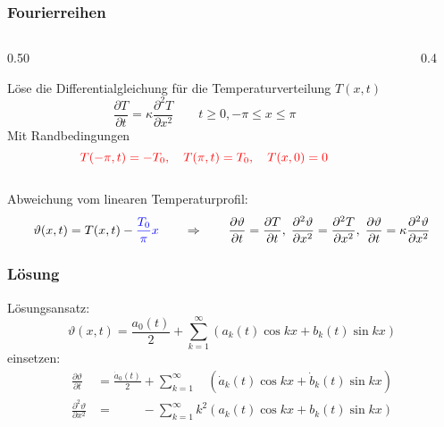 \begin{frame}
\frametitle{Fourierreihen}
\begin{columns}
\begin{column}{0.50\hsize}
\begin{aufgabe}
Löse die Differentialgleichung für die Temperaturverteilung $T(x,t)$
\vspace{-10pt}
\[
\frac{\partial T}{\partial t}
=
\kappa \frac{\partial^2 T}{\partial x^2}
\qquad
t\ge 0, -\pi \le x \le \pi
\]
Mit Randbedingungen
\[
\color{red}
T(-\pi,t) = -T_0,\quad T(\pi,t)=T_0,\quad T(x,0)=0
\]
\vspace{-10pt}
\end{aufgabe}
\end{column}
\begin{column}{0.4\hsize}
\begin{center}
\end{center}
\end{column}
\end{columns}
\begin{anomalie}
Abweichung vom linearen Temperaturprofil:
\[
\vartheta(x,t) = T(x,t) - {\color{blue}\frac{T_0}{\pi}x}
\qquad
\Rightarrow
\qquad
\frac{\partial \vartheta}{\partial t} = \frac{\partial T}{\partial t},
\;
\frac{\partial^2\vartheta}{\partial x^2} = \frac{\partial^2 T}{\partial x^2},
\;
\frac{\partial \vartheta}{\partial t}
=
\kappa \frac{\partial^2 \vartheta}{\partial x^2}
\]
\end{anomalie}
\end{frame}

%
%
%
\begin{frame}
\frametitle{Lösung}
Lösungsansatz:
\[
\vartheta(x,t)
=
\frac{a_0(t)}2 + \sum_{k=1}^\infty (a_k(t) \cos kx+b_k(t)\sin kx)
\]
einsetzen:
\begin{align*}
\frac{\partial \vartheta}{\partial t}
&=
\frac{\dot a_0(t)}2
+
\sum_{k=1}^\infty \phantom{k^2}(\dot a_k(t) \cos kx+\dot b_k(t)\sin kx)
\\
\frac{\partial^2\vartheta}{\partial x^2}
&=
\phantom{\frac{\dot a_0(t)}2}
-\sum_{k=1}^\infty k^2(a_k(t) \cos kx+b_k(t)\sin kx)
\end{align*}

\end{frame}

